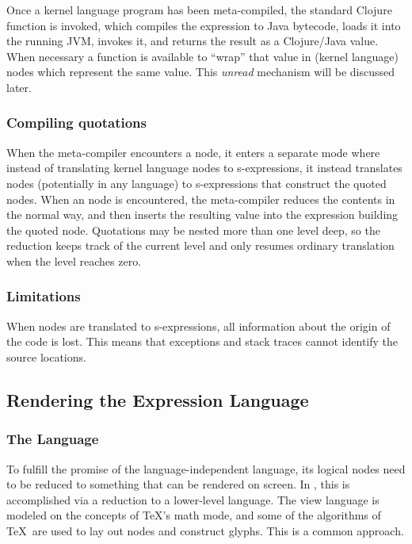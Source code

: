Once a kernel language program has been meta-compiled, the standard Clojure function  is invoked, which compiles the expression to Java bytecode, loads it into the running JVM, invokes it, and returns the result as a Clojure/Java value. When necessary a function is available to ``wrap'' that value in (kernel language) nodes which represent the same value. This \emph{unread} mechanism will be discussed later. 


\subsubsection{Compiling quotations}
When the meta-compiler encounters a  node, it enters a separate mode where instead of translating kernel language nodes to s-expressions, it instead translates nodes (potentially in any language) to s-expressions that construct the quoted nodes. When an  node is encountered, the meta-compiler reduces the contents in the normal way, and then inserts the resulting value into the expression building the quoted node. Quotations may be nested more than one level deep, so the reduction keeps track of the current level and only resumes ordinary translation when the level reaches zero. 




\subsubsection{Limitations}
When nodes are translated to s-expressions, all information about the origin of the code is lost. This means that exceptions and stack traces cannot identify the source locations.



%
%
\subsection{Rendering the Expression Language}

\subsubsection{The  Language}
To fulfill the promise of the language-independent  language, its logical nodes need to be reduced to something that can be rendered on screen. In \Meta, this is accomplished via a reduction to a lower-level  language. The view language is modeled on the concepts of \TeX's math mode\cite{tex-math}, and some of the algorithms of \TeX\ are used to lay out nodes and construct glyphs. This is a common approach\cite{mathml}.

